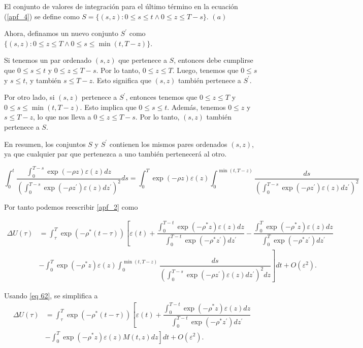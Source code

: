 El conjunto de valores de integración para el último término en la ecuación (\ref{apf_4}) se define como $S = \{ (s, z): 0 \leq s \leq t \land 0 \leq z \leq T - s \} .$
$\left(a \right)$

Ahora, definamos un nuevo conjunto $S^{\prime}$ como $\{(s, z) : 0 \leq z \leq T \land 0 \leq s \leq \min\left(t, T - z\right)\}$.

Si tenemos un par ordenado $(s, z)$ que pertenece a $S$, entonces debe cumplirse que $0 \leq s \leq t$ y $0 \leq z \leq T - s$. Por lo tanto, $0 \leq z \leq T$. Luego, tenemos que $0 \leq s$ y $s \leq t$, y también $s \leq T - z$. Esto significa que $(s, z)$ también pertenece a $S^{\prime}$.

Por otro lado, si $(s, z)$ pertenece a $S^{\prime}$, entonces tenemos que $0 \leq z \leq T$ y $0 \leq s \leq \min\left(t, T - z\right)$. Esto implica que $0 \leq s \leq t$. Además, tenemos $0 \leq z$ y $s \leq T - z$, lo que nos lleva a $0 \leq z \leq T - s$. Por lo tanto, $(s, z)$ también pertenece a $S$.

En resumen, los conjuntos $S$ y $S^{\prime}$ contienen los mismos pares ordenados $(s, z)$, ya que cualquier par que pertenezca a uno también pertenecerá al otro.

$$\int_0^t \dfrac{\int_0^{T-s}\exp(-\rho z)\varepsilon(z)dz}{\left( \int_0^{T-s}\exp(-\rho z^{\prime})\varepsilon(z)dz^{\prime}\right)^2}ds= \int_0^T \exp(-\rho z)\varepsilon(z) \int_0^{\min\left(t, T - z\right)} \dfrac{ds}{\left( \int_0^{T-s}\exp(-\rho z^{\prime})\varepsilon(z)dz^{\prime}\right)^2}$$

Por tanto podemos reescribir \ref{apf_2} como

\begin{equation*}
    \begin{split}
        \Delta U(\tau) &= \int_{\tau}^T \exp(- \rho^{*}(t- \tau)) \left[ \varepsilon(t) + \dfrac{\int_0^{T-t}\exp(-\rho^{*}z) \varepsilon(z)dz}{\int_0^{T-t}\exp(-\rho^{*}z^{\prime}) dz^{\prime}} - \dfrac{\int_0^{T}\exp(-\rho^{*}z) \varepsilon(z)dz}{\int_0^{T}\exp(-\rho^{*}z^{\prime}) dz^{\prime}}\right. \\ &-\left. \int_0^T \exp(- \rho^*z) \varepsilon(z) \int_0^{\min\left(t, T - z\right)} \dfrac{ds}{\left( \int_0^{T-s}\exp(-\rho z^{\prime})\varepsilon(z)dz^{\prime}\right)^2dz} \right]dt + O(\varepsilon^2).
    \end{split}
\end{equation*}


Usando \ref{eq 62}, se simplifica a 
\begin{equation}
\label{apf_6}
    \begin{split}
        \Delta U(\tau) &= \int_{\tau}^T \exp(- \rho^{*}(t- \tau)) \left[ \varepsilon(t) + \dfrac{\int_0^{T-t}\exp(-\rho^{*}z) \varepsilon(z)dz}{\int_0^{T-t}\exp(-\rho^{*}z^{\prime}) dz^{\prime}} \right. \\
        &-\left. \int_0^T \exp(- \rho^*z) \varepsilon(z) M(t,z)dz \right]dt + O(\varepsilon^2).
    \end{split}
\end{equation}

